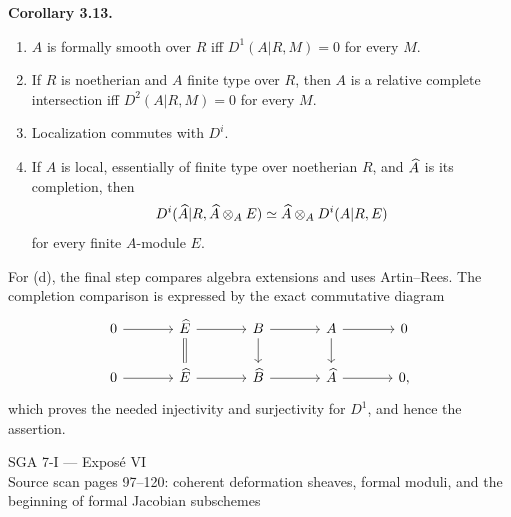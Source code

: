 \documentclass[11pt]{article}
\providecommand{\Aut}{\operatorname{Aut}}
\providecommand{\Spf}{\operatorname{Spf}}
\begin{document}
\textbf{Corollary 3.13.}
\begin{enumerate}[label=\textup{(\alph*)}]
\item \(A\) is formally smooth over \(R\) iff \(D^1(A|R,M)=0\) for every \(M\).
\item If \(R\) is noetherian and \(A\) finite type over \(R\), then \(A\) is a relative complete intersection iff \(D^2(A|R,M)=0\) for every \(M\).
\item Localization commutes with \(D^i\).
\item If \(A\) is local, essentially of finite type over noetherian \(R\), and \(\widehat A\) is its completion, then
\[
D^i(\widehat A|R,\widehat A\otimes_AE)\simeq \widehat A\otimes_AD^i(A|R,E)
\]
for every finite \(A\)-module \(E\).
\end{enumerate}
For (d), the final step compares algebra extensions and uses Artin--Rees.  The completion comparison is expressed by the exact commutative diagram
\[
\begin{tikzcd}[column sep=large]
0\arrow[r]&\Ehat\arrow[r]\arrow[d,equal]&B\arrow[r]\arrow[d]&A\arrow[r]\arrow[d]&0\\
0\arrow[r]&\Ehat\arrow[r]&\Bhat\arrow[r]&\Ahat\arrow[r]&0,
\end{tikzcd}
\]
which proves the needed injectivity and surjectivity for \(D^1\), and hence the assertion.



\providecommand{\Sing}{\operatorname{Sing}}
\providecommand{\Supp}{\operatorname{Supp}}
\providecommand{\depth}{\operatorname{depth}}
\providecommand{\Fitt}{\operatorname{Fitt}}
\providecommand{\Jac}{\operatorname{Jac}}
\providecommand{\sHom}{\mathcal Hom}
\providecommand{\RHom}{\operatorname{RHom}}
\providecommand{\Aut}{\operatorname{Aut}}
\providecommand{\Der}{\operatorname{Der}}
\providecommand{\Spf}{\operatorname{Spf}}
\providecommand{\cM}{\mathcal M}
\providecommand{\cB}{\mathcal B}
\providecommand{\cJ}{\mathcal J}
\providecommand{\cI}{\mathcal I}
\providecommand{\cL}{\mathcal L}
\providecommand{\cR}{\mathcal R}
\providecommand{\cT}{\mathcal T}
\providecommand{\cU}{\mathcal U}
\providecommand{\T}{\mathcal T}
\providecommand{\cV}{\mathcal V}
\providecommand{\kdual}{k[\varepsilon]}


\begin{center}
{\Large SGA 7-I — Exposé VI}\\[0.3em]
{\large Source scan pages 97--120: coherent deformation sheaves, formal moduli, and the beginning of formal Jacobian subschemes}
\end{center}
\end{document}
